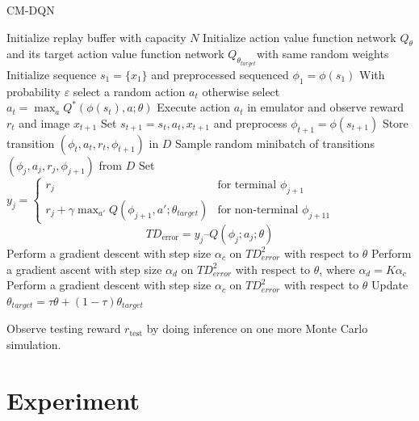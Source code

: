 \documentclass[10pt,letterpaper]{article}
\begin{document}
\begin{algorithm*}
    \caption{CM-DQN}
    \label{algo: CM-DQN}
    \begin{algorithmic}[1]
    \State Initialize replay buffer with capacity $N$
    \State Initialize action value function network $Q_{\theta}$ and its target action value function network $Q_{\theta_{target}}$with  same random weights
    \State Initialize sequence $s_1 = \{x_1\}$ and preprocessed sequenced $\phi_1 = \phi(s_1)$
        \State With probability $\varepsilon$ select a random action $a_t$
        \State otherwise select $a_t = \max_a Q^*(\phi(s_t), a; \theta)$
        \State Execute action $a_t$ in emulator and observe reward $r_t$ and image $x_{t+1}$
        \State Set $s_{t+1} = s_t, a_t, x_{t+1}$ and preprocess $\phi_{t+1} = \phi(s_{t+1})$
        \State Store transition $(\phi_t, a_t, r_t, \phi_{t+1})$ in $D$
        \State Sample random minibatch of transitions $(\phi_j , a_j , r_j , \phi_{j+1})$ from $D$
        \State Set $y_j =\begin{cases} 
        r_j & \text{for terminal } \phi_{j+1} \\
        r_j + \gamma \max_{a'} Q(\phi_{j+1} , a'; \theta_{target}) & \text{for non-terminal } \phi_{j+11}
        \end{cases}$
        \State \begin{equation*}
            TD_{\text{error}} =y_j – Q(\phi_j ; a_j ; \theta)
        \end{equation*}
        \State Perform a gradient descent with step size $\alpha_c$ on $TD_{error}^2$ with respect to $\theta$
        \State Perform a gradient ascent with step size $\alpha_d$ on $TD_{error}^2$ with respect to $\theta$, where $\alpha_d = K\alpha_{c}$ 
        \Else
        \State Perform a gradient descent with step size $\alpha_c$ on $TD_{error}^2$ with respect to $\theta$           \EndIf
    \EndFor
    \State Update $
    \theta_{target} = \tau \theta + (1-\tau) \theta_{target}$

        \State Observe testing reward $r_{\text{test}}$ by doing inference on one more Monte Carlo simulation.
\EndFor
    \end{algorithmic}
\end{algorithm*}
\section{Experiment}
\end{document}
